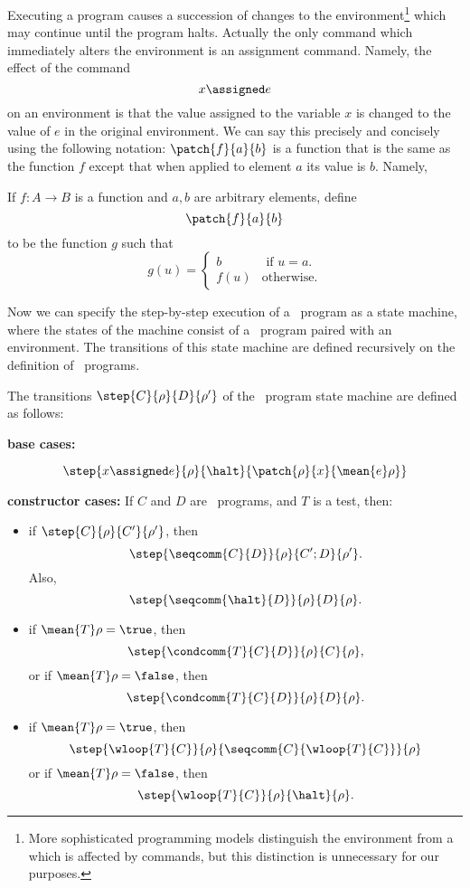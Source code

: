 \iffalse
(A variable is a special case of an expression, so $\mean{x}\rho \eqdef \rho(x)$.)
\fi

Executing a program causes a succession of changes to the
environment\footnote{More sophisticated programming models distinguish
the environment from a  which is affected by commands, but
this distinction is unnecessary for our purposes.}  which may continue
until the program halts.  Actually the only command which immediately
alters the environment is an assignment command.  Namely, the effect
of the command
\[
x \assigned e
\]
on an environment is that the value assigned to the variable $x$ is
changed to the value of $e$ in the original environment.  We can say
this precisely and concisely using the following notation:
$\patch{f}{a}{b}$ is a function that is the same as the function $f$
except that when applied to element $a$ its value is $b$.  Namely,
\begin{definition}
If $f:A \to B$ is a function and $a,b$ are arbitrary elements, define
  \[
\patch{f}{a}{b}
\]
to be the function $g$ such that
\begin{equation*}
g(u) = \begin{cases}
         b & \text{ if } u = a.\\
         f(u) & \text{otherwise.}
       \end{cases}
\end{equation*}
\end{definition}

Now we can specify the step-by-step execution of a \while\ program as a state
machine, where the states of the machine consist of a \while\ program paired with an
environment.  The transitions of this state machine are defined
recursively on the definition of \while\ programs.

\begin{definition}

The transitions $\step{C}{\rho}{D}{\rho'}$ of the \while\ program state machine are
defined as follows:

\textbf{base cases:}

\[
\step{x \assigned e}{\rho}{\halt}{\patch{\rho}{x}{\mean{e}\rho}}
\]

\textbf{constructor cases:}
If $C$ and $D$ are \while\ programs, and $T$ is a test, then:

\begin{itemize}

\item if $\step{C}{\rho}{C'}{\rho'}$, then
\[
\step{\seqcomm{C}{D}}{\rho}{C';D}{\rho'}.
\]
Also,
\[
\step{\seqcomm{\halt}{D}}{\rho}{D}{\rho}.
\]

\item if $\mean{T}\rho = \true$, then
\[
\step{\condcomm{T}{C}{D}}{\rho}{C}{\rho},
\]
or if $\mean{T}\rho = \false$, then
\[
\step{\condcomm{T}{C}{D}}{\rho}{D}{\rho}.
\]

\item if $\mean{T}\rho = \true$, then
\[
\step{\wloop{T}{C}}{\rho}{\seqcomm{C}{\wloop{T}{C}}}{\rho}
\]
or if $\mean{T}\rho = \false$, then
\[
\step{\wloop{T}{C}}{\rho}{\halt}{\rho}.
\]
\end{itemize}
\end{definition}

